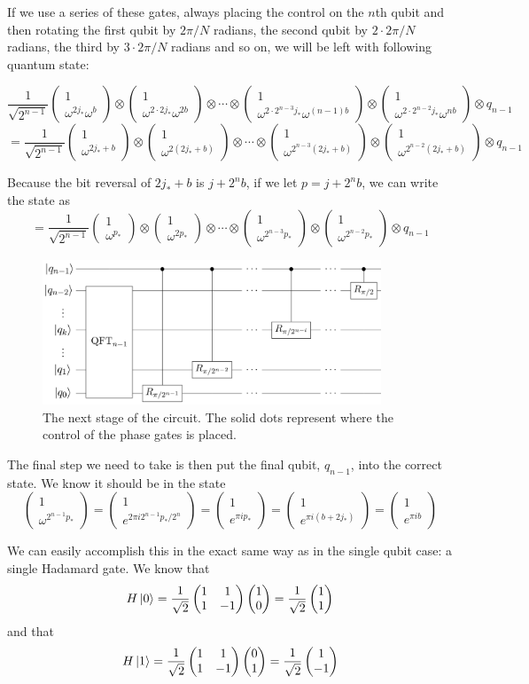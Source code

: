 \documentclass[11pt]{report}
\newcommand{\?}{\stackrel{?}{=}}
\newcommand{\qcol}[2]{\ensuremath{\begin{pmatrix} #1 \\ #2 \end{pmatrix}}}
\begin{document}
If we use a series of these gates, always placing the control on the $n$th qubit and then rotating the first qubit by $2\pi/N$ radians, the second qubit by $2\cdot 2\pi/N$ radians, the third by $3\cdot 2\pi/N$ radians and so on, we will be left with following quantum state:

$$\frac{1}{\sqrt{2^{n-1}}} 
  \qcol{1}{\omega^{2j_*}\omega^{b}}
  \otimes
  \qcol{1}{\omega^{2\cdot2j_*}\omega^{2b}}
  \otimes \cdots \otimes
  \qcol{1}{\omega^{2\cdot2^{n-3}j_*}\omega^{(n-1)b}}
  \otimes
  \qcol{1}{\omega^{2\cdot2^{n-2}j_*}\omega^{nb}}
  \otimes q_{n-1}$$
$$= \frac{1}{\sqrt{2^{n-1}}} 
  \qcol{1}{\omega^{2j_* + b}}
  \otimes
  \qcol{1}{\omega^{2(2j_* + b)}}
  \otimes \cdots \otimes
  \qcol{1}{\omega^{2^{n-3}(2j_* + b)}}
  \otimes
  \qcol{1}{\omega^{2^{n-2}(2j_* + b)}}
  \otimes q_{n-1}$$
  
Because the bit reversal of $2j_* + b$ is $j + 2^nb$, if we let $p = j + 2^nb$, we can write the state as
$$= \frac{1}{\sqrt{2^{n-1}}} 
  \qcol{1}{\omega^{p_*}}
  \otimes
  \qcol{1}{\omega^{2p_*}}
  \otimes \cdots \otimes
  \qcol{1}{\omega^{2^{n-3}p_*}}
  \otimes
  \qcol{1}{\omega^{2^{n-2}p_*}}
  \otimes q_{n-1}$$

\begin{figure}[h]
\centering
\includegraphics[width=0.9\textwidth]{resources/images/qft2.png}
\caption{\label{fig:qft2}The next stage of the circuit. The solid dots represent where the control of the phase gates is placed.}
\end{figure}


The final step we need to take is then put the final qubit, $q_{n-1}$, into the correct state. We know it should be in the state
$$\qcol{1}{\omega^{2^{n-1}p_*}} = \qcol{1}{e^{2\pi i 2^{n-1}p_* / 2^n}} = \qcol{1}{e^{\pi i p_*}} = \qcol{1}{e^{\pi i (b + 2j_*)}} = \qcol{1}{e^{\pi i b}}$$

We can easily accomplish this in the exact same way as in the single qubit case: a single Hadamard gate. We know that
$$H\Ket{0} = \frac{1}{\sqrt{2}}\begin{pmatrix}
1 & 1\\
1 & -1
\end{pmatrix} \qcol{1}{0} = \frac{1}{\sqrt{2}} \qcol{1}{1}$$
and that
$$H\Ket{1} = \frac{1}{\sqrt{2}}\begin{pmatrix}
1 & 1\\
1 & -1
\end{pmatrix} \qcol{0}{1} = \frac{1}{\sqrt{2}} \qcol{1}{-1}$$
\end{document}

